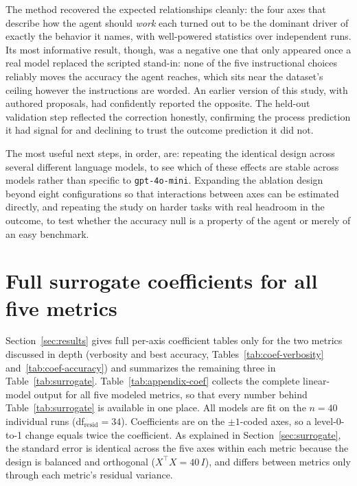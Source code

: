 \documentclass[11pt]{article}
\begin{document}
The method recovered the expected relationships cleanly: the four axes that describe how the agent should \emph{work} each turned out to be the dominant driver of exactly the behavior it names, with well-powered statistics over independent runs. Its most informative result, though, was a negative one that only appeared once a real model replaced the scripted stand-in: none of the five instructional choices reliably moves the accuracy the agent reaches, which sits near the dataset's ceiling however the instructions are worded. An earlier version of this study, with authored proposals, had confidently reported the opposite. The held-out validation step reflected the correction honestly, confirming the process prediction it had signal for and declining to trust the outcome prediction it did not.

The most useful next steps, in order, are: repeating the identical design across several different language models, to see which of these effects are stable across models rather than specific to \texttt{gpt-4o-mini}. Expanding the ablation design beyond eight configurations so that interactions between axes can be estimated directly, and repeating the study on harder tasks with real headroom in the outcome, to test whether the accuracy null is a property of the agent or merely of an easy benchmark.

\appendix

\section{Full surrogate coefficients for all five metrics}
\label{sec:appendix-coef}

Section~\ref{sec:results} gives full per-axis coefficient tables only for the two metrics discussed in depth (verbosity and best accuracy, Tables~\ref{tab:coef-verbosity} and~\ref{tab:coef-accuracy}) and summarizes the remaining three in Table~\ref{tab:surrogate}. Table~\ref{tab:appendix-coef} collects the complete linear-model output for all five modeled metrics, so that every number behind Table~\ref{tab:surrogate} is available in one place. All models are fit on the $n=40$ individual runs (df$_{\text{resid}}=34$). Coefficients are on the $\pm1$-coded axes, so a level-0-to-1 change equals twice the coefficient. As explained in Section~\ref{sec:surrogate}, the standard error is identical across the five axes within each metric because the design is balanced and orthogonal ($X^\top X = 40\,I$), and differs between metrics only through each metric's residual variance.
\end{document}
